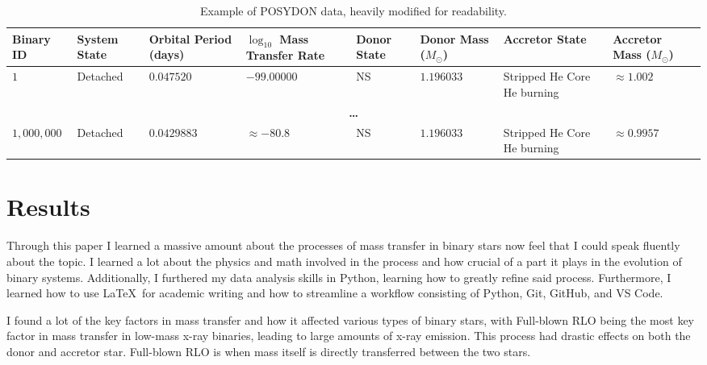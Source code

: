 \documentclass[12pt, a4paper]{article}
\begin{document}
    \begin{table}[H]
        \footnotesize
            \centering
            \begin{tabularx}{\textwidth}{||X|X|X|X|X|X|X|X||}
                \hline 
                \textbf{Binary ID} & 
                \textbf{System State} & 
                \textbf{Orbital Period (days)} & 
                \textbf{$\log_{10}$ Mass Transfer Rate} & 
                \textbf{Donor State} & 
                \textbf{Donor Mass} ($M_\odot$) & 
                \textbf{Accretor State} & 
                \textbf{Accretor Mass} ($M_\odot$) \\
                \hline \hline
                $1$ & Detached & $0.047520$ & $-99.00000$ & NS & $1.196033$ & Stripped He Core He burning & $\approx 1.002$ \\
                \hline
                \multicolumn{8}{||c||}{\textbf{\ldots}}\\
                \hline
                $1,000,000$ & Detached & $0.0429883$ & $\approx -80.8$ & NS & $1.196033$ & Stripped He Core He burning & $\approx 0.9957$ \\
                \hline
            \end{tabularx}
            \caption{Example of POSYDON data, heavily modified for readability.}
            \label{POSYDONDataExample}
        \end{table}
        


\section{Results}
    Through this paper I learned a massive amount about the processes of mass transfer in binary stars now feel that I could speak fluently about the topic. I learned a lot about the physics and math involved in the process and how crucial of a part it plays in the evolution of binary systems. Additionally, I furthered my data analysis skills in Python, learning how to greatly refine said process. Furthermore, I learned how to use \LaTeX~for academic writing and how to streamline a workflow consisting of Python, Git, GitHub, and VS Code.

    I found a lot of the key factors in mass transfer and how it affected various types of binary stars, with Full-blown RLO being the most key factor in mass transfer in low-mass x-ray binaries, leading to large amounts of x-ray emission. This process had drastic effects on both the donor and accretor star. Full-blown RLO is when mass itself is directly transferred between the two stars.
\end{document}
